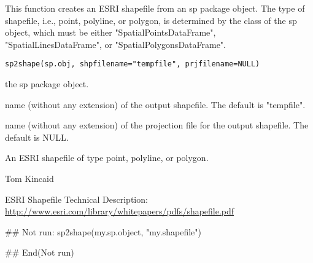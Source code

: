 \begin{Description}\relax
This function creates an ESRI shapefile from an sp package object.  The type 
of shapefile, i.e., point, polyline, or polygon, is determined by the class of
the sp object, which must be either "SpatialPointsDataFrame",
"SpatialLinesDataFrame", or "SpatialPolygonsDataFrame".
\end{Description}
\begin{Usage}
\begin{verbatim}
sp2shape(sp.obj, shpfilename="tempfile", prjfilename=NULL)
\end{verbatim}
\end{Usage}
\begin{Arguments}
\begin{ldescription}
\item[\code{sp.obj}] the sp package object.
\item[\code{shpfilename}] name (without any extension) of the output shapefile.  The
default is "tempfile".
\item[\code{prjfilename}] name (without any extension) of the projection file for the
output shapefile.  The default is NULL.
\end{ldescription}
\end{Arguments}
\begin{Value}
An ESRI shapefile of type point, polyline, or polygon.
\end{Value}
\begin{Author}\relax
Tom Kincaid 
\end{Author}
\begin{References}\relax
ESRI Shapefile Technical Description: 
\url{http://www.esri.com/library/whitepapers/pdfs/shapefile.pdf}
\end{References}
\begin{Examples}
\begin{ExampleCode}
  ## Not run: 
  sp2shape(my.sp.object, "my.shapefile")
  
## End(Not run)
\end{ExampleCode}
\end{Examples}

